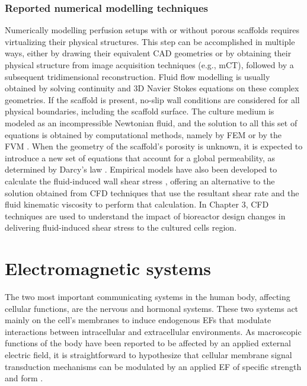 \subsubsection{Reported numerical modelling techniques}
Numerically modelling perfusion setups with or without porous scaffolds requires virtualizing their physical structures. This step can be accomplished in multiple ways, either by drawing their equivalent \ac{CAD} geometries or by obtaining their physical structure from image acquisition techniques (e.g., \ac{mCT}), followed by a subsequent tridimensional reconstruction. Fluid flow modelling is usually obtained by solving continuity and \ac{3D} Navier Stokes equations on these complex geometries. If the scaffold is present, no-slip wall conditions are considered for all physical boundaries, including the scaffold surface. The culture medium is modeled as an incompressible Newtonian fluid, and the solution to all this set of equations is obtained by computational methods, namely by \ac{FEM} \cite{Campos_Marin2018-ff, McCoy2012-jv, Vis2023-xt} or by the \ac{FVM} \cite{De_Wildt2023-ev}. When the geometry of the scaffold's porosity is unknown, it is expected to introduce a new set of equations that account for a global permeability, as determined by Darcy's law \cite{De_Wildt2023-ev}. Empirical models have also been developed to calculate the fluid-induced wall shear stress \cite{Ahmed2023-es}, offering an alternative to the solution obtained from \ac{CFD} techniques that use the resultant shear rate and the fluid kinematic viscosity to perform that calculation. In Chapter 3, \ac{CFD} techniques are used to understand the impact of bioreactor design changes in delivering fluid-induced shear stress to the cultured cells region.



\section{Electromagnetic systems}
The two most important communicating systems in the human body, affecting cellular functions, are the nervous and hormonal systems. These two systems act mainly on the cell's membranes to induce endogenous \ac{EF}s that modulate interactions between intracellular and extracellular environments. As macroscopic functions of the body have been reported to be affected by an applied external electric field, it is straightforward to hypothesize that cellular membrane signal transduction mechanisms can be modulated by an applied \ac{EF} of specific strength and form \cite{Seegers2001-jo}.

